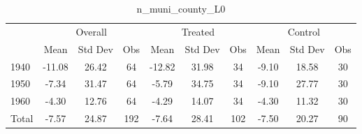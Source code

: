 \begin{table}[htbp]\centering
\def\sym#1{\ifmmode^{#1}\else\(^{#1}\)\fi}
\caption{n\_muni\_county\_L0 \label{tab1}}
\begin{tabular}{l*{3}{ccc}}
\toprule
                    &\multicolumn{3}{c}{Overall}           &\multicolumn{3}{c}{Treated}           &\multicolumn{3}{c}{Control}           \\
                    &        Mean&     Std Dev&         Obs&        Mean&     Std Dev&         Obs&        Mean&     Std Dev&         Obs\\
\midrule
1940                &      -11.08&       26.42&          64&      -12.82&       31.98&          34&       -9.10&       18.58&          30\\
1950                &       -7.34&       31.47&          64&       -5.79&       34.75&          34&       -9.10&       27.77&          30\\
1960                &       -4.30&       12.76&          64&       -4.29&       14.07&          34&       -4.30&       11.32&          30\\
Total               &       -7.57&       24.87&         192&       -7.64&       28.41&         102&       -7.50&       20.27&          90\\
\bottomrule
\end{tabular}
\end{table}
